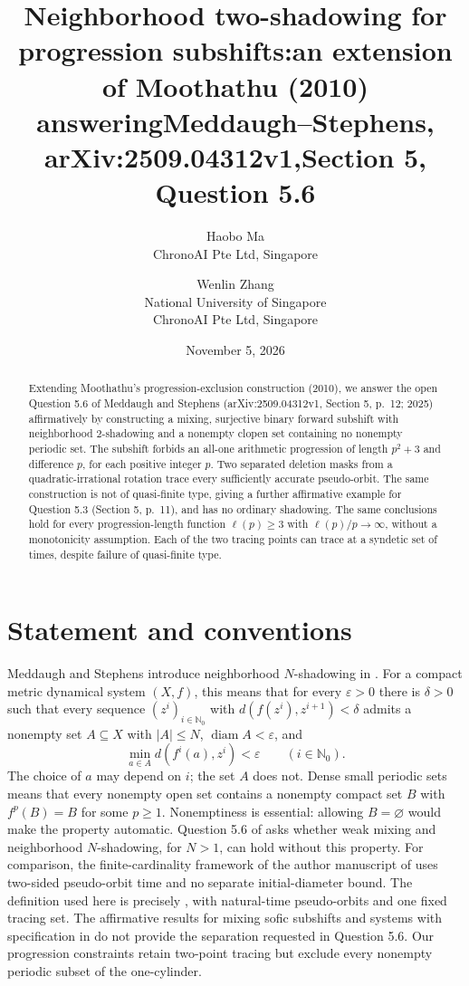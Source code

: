 \documentclass[11pt]{article}
\title{Neighborhood two-shadowing for progression subshifts:\newline an extension of Moothathu (2010) answering\newline Meddaugh--Stephens, arXiv:2509.04312v1,\newline Section 5, Question 5.6}
\author{Haobo Ma\\\small ChronoAI Pte Ltd, Singapore
\and Wenlin Zhang\\\small National University of Singapore\\\small ChronoAI Pte Ltd, Singapore}
\date{November 5, 2026}
\newcommand{\NN}{\mathbb N_0}
\newcommand{\diam}{\operatorname{diam}}
\begin{document}
\maketitle
\begin{abstract}
Extending Moothathu's progression-exclusion construction (2010),
we answer the open Question 5.6 of Meddaugh and Stephens
(arXiv:2509.04312v1, Section 5, p.~12; 2025) affirmatively by constructing a mixing,
surjective binary forward subshift with neighborhood $2$-shadowing
and a nonempty clopen set containing no nonempty periodic set.
The subshift forbids an all-one arithmetic progression of length
$p^2+3$ and difference $p$, for each positive integer $p$.
Two separated deletion masks from a quadratic-irrational rotation
trace every sufficiently accurate pseudo-orbit. The same construction
is not of quasi-finite type, giving a further affirmative example for
Question 5.3 (Section 5, p.~11), and has no ordinary shadowing.
The same conclusions hold for every progression-length function
$\ell(p)\geq3$ with $\ell(p)/p\to\infty$, without a monotonicity
assumption. Each of the two tracing points can trace at a syndetic
set of times, despite failure of quasi-finite type.
\end{abstract}

\section{Statement and conventions}
Meddaugh and Stephens introduce neighborhood $N$-shadowing in
\cite[Definition 2.1]{MS}. For a compact metric dynamical system
$(X,f)$, this means that for every $\varepsilon>0$ there is $\delta>0$
such that every sequence $(z^i)_{i\in\NN}$ with
$d(f(z^i),z^{i+1})<\delta$ admits a nonempty set $A\subseteq X$ with
$|A|\leq N$, $\diam A<\varepsilon$, and
\[
 \min_{a\in A}d(f^i(a),z^i)<\varepsilon\qquad(i\in\NN).
\]
The choice of $a$ may depend on $i$; the set $A$ does not.
Dense small periodic sets means that every nonempty open set contains
a nonempty compact set $B$ with $f^p(B)=B$ for some $p\geq1$.
Nonemptiness is essential: allowing $B=\varnothing$ would make the
property automatic. Question 5.6 of \cite[Section 5, p.~12]{MS} asks whether weak mixing and neighborhood
$N$-shadowing, for $N>1$, can hold without this property.
For comparison, the finite-cardinality framework of
the author manuscript of \cite[Definition 1.5]{CLMV} uses two-sided pseudo-orbit time and no
separate initial-diameter bound. The definition used here is precisely
\cite[Definition 2.1]{MS}, with natural-time pseudo-orbits and one fixed
tracing set. The affirmative results for mixing sofic subshifts and
systems with specification in \cite[Theorems 3.2, 3.3 and 4.2]{MS}
do not provide the separation requested in Question 5.6.
Our progression constraints retain two-point tracing but exclude
every nonempty periodic subset of the one-cylinder.
\end{document}
